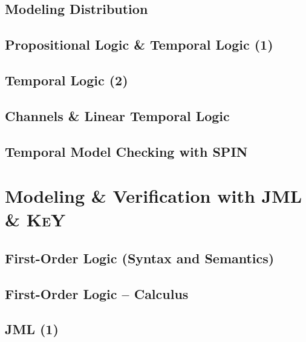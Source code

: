 \documentclass[12pt,accentcolor=tud1b,bibtotoc,colorback,linedtoc,liststotoc,bigchapter,noresetcounter]{tudreport}
\begin{document}
\section{Modeling Distribution}

\newpage

\section{Propositional Logic \& Temporal Logic (1)}

\newpage

\section{Temporal Logic (2)}

\newpage

\section{Channels \& Linear Temporal Logic}

\newpage

\section{Temporal Model Checking with SPIN}

\newpage


\chapter{Modeling \& Verification with JML \& \textsc{KeY}}

\section{First-Order Logic (Syntax and Semantics)}

\newpage

\section{First-Order Logic -- Calculus}

\newpage

\section{JML (1)}

\newpage
\end{document}
